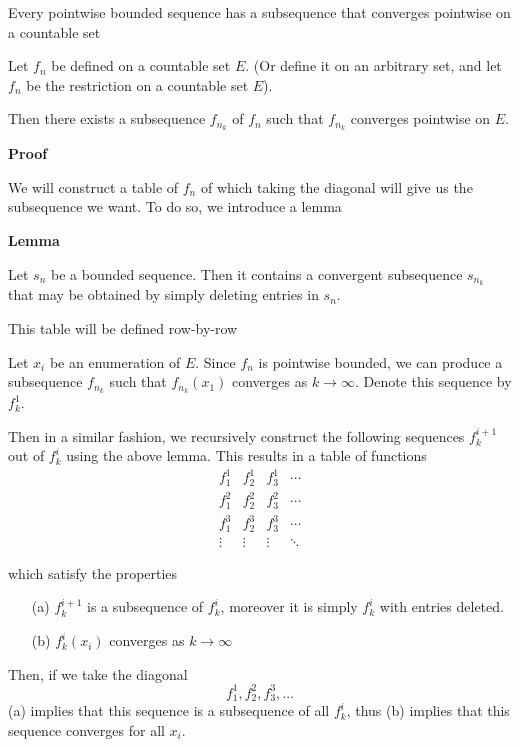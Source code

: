 \begin{theorem}Every pointwise bounded sequence has a subsequence that converges pointwise on a countable set

    Let $f_n$ be defined on a countable set $E$. (Or define it on an arbitrary set, and let $f_n$ be the restriction on a countable set $E$).

    Then there exists a subsequence $f_{n_k}$ of $f_n$ such that $f_{n_k}$ converges pointwise on $E$.

    \textbf{Proof}

    We will construct a table of $f_n$ of which taking the diagonal will give us the subsequence we want. To do so, we introduce a lemma

    \begin{lemma}
    \textbf{Lemma}

    Let $s_n$ be a bounded sequence. Then it contains a convergent subsequence $s_{n_k}$ that may be obtained by simply deleting entries in $s_n$.
    \end{lemma}

    This table will be defined row-by-row

    Let $x_i$ be an enumeration of $E$. Since $f_n$ is pointwise bounded, we can produce a subsequence $f_{n_k}$ such that $f_{n_k}(x_1)$ converges as $k \to \infty$. Denote this sequence by $f^1_k$. 

    Then in a similar fashion, we recursively construct the following sequences $f^{i+1}_k$ out of $f^i_k$ using the above lemma. This results in a table of functions
    \[\begin{matrix}
        f^1_1 & f^1_2 & f^1_3 & \cdots \\
        f^2_1 & f^2_2 & f^2_3 & \cdots \\
        f^3_1 & f^3_2 & f^3_3 & \cdots \\
        \vdots & \vdots & \vdots & \ddots
    \end{matrix}\]

    which satisfy the properties
    \begin{itemize}
        \item[(a)] $f^{i+1}_k$ is a subsequence of $f^i_k$, moreover it is simply $f^i_k$ with entries deleted. 
        \item[(b)] $f^i_k(x_i)$ converges as $k \to \infty$
    \end{itemize}

    Then, if we take the diagonal
    \[f^1_1, f^2_2,  f^3_3, \ldots\] 
    (a) implies that this sequence is a subsequence of all $f^i_k$, thus (b) implies that this sequence converges for all $x_i$.
\end{theorem}


